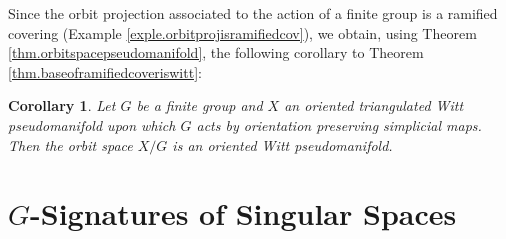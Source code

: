 \documentclass{amsart}
\newtheorem{cor}[thm]{Corollary}
\theoremstyle{definition}
\theoremstyle{remark}
\begin{document}
Since the orbit projection associated to the action of a finite group
is a ramified covering (Example \ref{exple.orbitprojisramifiedcov}), 
we obtain, using Theorem \ref{thm.orbitspacepseudomanifold}, 
the following corollary to Theorem \ref{thm.baseoframifiedcoveriswitt}:
\begin{cor} \label{cor.orbitspaceiswitt}
Let $G$ be a finite group and $X$ an oriented triangulated Witt pseudomanifold
upon which $G$ acts by orientation preserving simplicial maps.
Then the orbit space $X/G$ is an oriented Witt pseudomanifold.
\end{cor}





\section{$G$-Signatures of Singular Spaces}
\label{sec.gsignatures}
\end{document}
